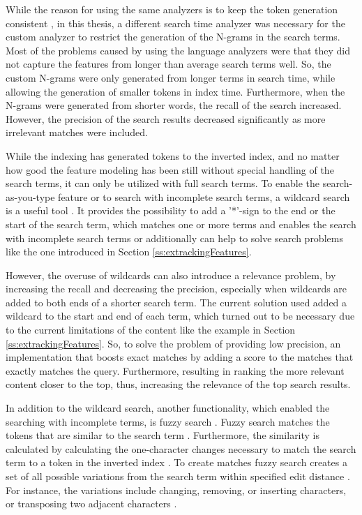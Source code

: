 While the reason for using the same analyzers is to keep the token generation consistent \cite{relevantSearch}, 
in this thesis, a different search time analyzer was necessary for the custom analyzer to restrict 
the generation of the N-grams in the search terms. 
Most of the problems caused by using the language analyzers were that they did not capture the features
from longer than average search terms well.
So, the custom N-grams were only generated from longer terms in search time, 
while allowing the generation of smaller tokens in index time.
Furthermore, when the N-grams were generated from shorter words, the recall of the search increased.
However, the precision of the search results decreased significantly as more irrelevant matches were included.


While the indexing has generated tokens to the inverted index, and no matter how good the feature modeling has been
still without special handling of the search terms, it can only be utilized with full search terms.
To enable the search-as-you-type feature or to search with incomplete search terms, a wildcard search is 
a useful tool \cite{relevantSearch}.
It provides the possibility to add a '*'-sign to the end or the start of the search term, which matches one or more
terms and enables the search with incomplete search terms or additionally can help to solve search problems like
the one introduced in Section \ref{ss:extrackingFeatures}.


However, the overuse of wildcards can also introduce a relevance problem, by increasing the recall and decreasing 
the precision, especially when wildcards are added to both ends of a shorter search term. 
The current solution used added a wildcard to the start and end of each term, which turned out to be necessary
due to the current limitations of the content like the example in Section \ref{ss:extrackingFeatures}.
So, to solve the problem of providing low precision, an implementation that boosts exact matches 
by adding a score to the matches that exactly matches the query.
Furthermore, resulting in ranking the more relevant content closer to the top, thus, increasing
the relevance of the top search results.


In addition to the wildcard search, another functionality, which enabled the searching with incomplete terms, 
is fuzzy search \cite{relevantSearch}.
Fuzzy search matches the tokens that are similar to the search term \cite{elasticIntro}. 
Furthermore, the similarity is calculated by calculating the one-character 
changes necessary to match the search term to a token in the inverted index \cite{elasticIntro}.
To create matches fuzzy search creates a set of all possible variations from the search term within
specified edit distance \cite{elasticIntro}.
For instance, the variations include changing, removing, or inserting characters, or transposing two adjacent characters 
\cite{elasticIntro}.


